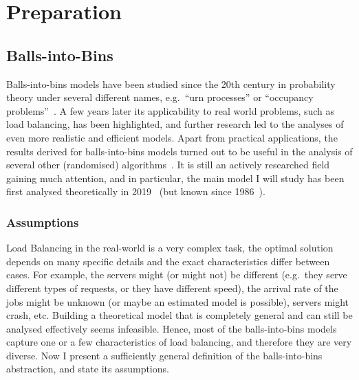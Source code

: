 \chapter{Preparation}\label{preparation}

\ifpdf
    \graphicspath{{Chapter2/Figs/Raster/}{Chapter2/Figs/PDF/}{Chapter2/Figs/}}
\else
    \graphicspath{{Chapter2/Figs/Vector/}{Chapter2/Figs/}}
\fi



\section{Balls-into-Bins}


Balls-into-bins models have been studied since the 20th century in probability theory under several different names, e.g.\ ``urn processes'' or ``occupancy problems''~\cite{kolchin1978coined}. A few years later its applicability to real world problems, such as load balancing, has been highlighted, and further research led to the analyses of even more realistic and efficient models. Apart from practical applications, the results derived for balls-into-bins models turned out to be useful in the analysis of several other (randomised) algorithms~\cite{edmonds2006cakecutting}. It is still an actively researched field gaining much attention, and in particular, the main model I will study has been first analysed theoretically in 2019~\cite{dwivedi2019firstthinning} (but known since 1986~\cite{derek1986twothinningfirstattempt}).


\subsection{Assumptions} \label{assumptions}



Load Balancing in the real-world is a very complex task, the optimal solution depends on many specific details and the exact characteristics differ between cases. For example, the servers might (or might not) be different (e.g.\ they serve different types of requests, or they have different speed), the arrival rate of the jobs might be unknown (or maybe an estimated model is possible), servers might crash, etc. Building a theoretical model that is completely general and can still be analysed effectively seems infeasible. Hence, most of the balls-into-bins models capture one or a few characteristics of load balancing, and therefore they are very diverse. Now I present a sufficiently general definition of the balls-into-bins abstraction, and state its assumptions. 

